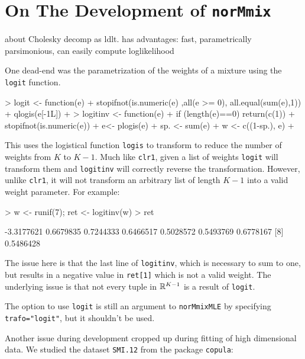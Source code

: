 \section{On The Development of {\tt norMmix}}
\label{sec:devel}

about Cholesky decomp as ldlt. has advantages: fast, parametrically 
parsimonious, can easily compute loglikelihood


One dead-end was the parametrization of the weights of a mixture using the 
{\tt logit} function.

\begin{Schunk}
\begin{Sinput}
> logit <- function(e) {
+     stopifnot(is.numeric(e) ,all(e >= 0), all.equal(sum(e),1))
+     qlogis(e[-1L])
+ }
> logitinv <- function(e) {
+     if (length(e)==0) {return(c(1))}
+     stopifnot(is.numeric(e))
+     e<- plogis(e)
+     sp. <- sum(e)
+     w <- c((1-sp.), e)
+ }
\end{Sinput}
\end{Schunk}

This uses the logistical function {\tt logis} to transform to reduce the number
of weights from $K$ to $K-1$. Much like {\tt clr1}, given a list of weights 
{\tt logit} will transform them and {\tt logitinv} will correctly reverse the 
transformation. However, unlike {\tt clr1}, it will not transform an arbitrary 
list of length $K-1$ into a valid weight parameter. For example:

\begin{Schunk}
\begin{Sinput}
> w <- runif(7); ret <- logitinv(w)
> ret
\end{Sinput}
\begin{Soutput}
[1] -3.3177621  0.6679835  0.7244333  0.6466517  0.5028572  0.5493769  0.6778167
[8]  0.5486428
\end{Soutput}
\end{Schunk}

The issue here is that the last line of {\tt logitinv}, which is necessary to 
sum to one, but results in a negative value in {\tt ret[1]} which is not a 
valid weight. The underlying issue is that not every tuple in $\mathbb{R}^{K-1}$ is 
a result of {\tt logit}.

The option to use {\tt logit} is still an argument to {\tt norMmixMLE} by 
specifying {\tt trafo="logit"}, but it shouldn't be used.



Another issue during development cropped up during fitting of high dimensional
data. We studied the dataset {\tt SMI.12} from the package {\tt copula}:

